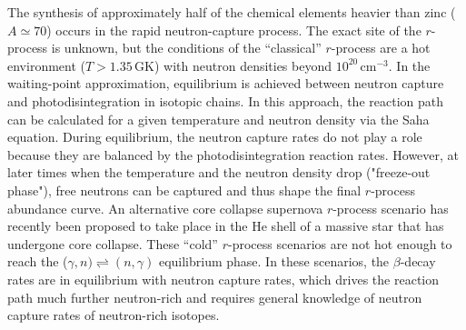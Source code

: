 {The synthesis of approximately half of the chemical elements heavier than zinc ($A \simeq 70$) occurs in the rapid neutron-capture process.
The exact site of the $r$-process is unknown, but the conditions of 
the ``classical'' $r$-process %
are a hot environment ($T> 1.35$\,GK) with neutron densities beyond %
$10^{20}$\,cm$^{-3}$. %
 In the waiting-point approximation, equilibrium is achieved between neutron capture and photodisintegration %
 in isotopic chains. %
In this approach, the reaction path can be  calculated for a given temperature and neutron density via the Saha equation. During equilibrium, the neutron capture rates do not play a role %
because they are balanced by the photodisintegration reaction rates. 
However, at later %
 times when 
the temperature and the neutron density drop ("freeze-out phase"), free neutrons %
can be captured and thus shape the final $r$-process abundance curve.
 An alternative core collapse supernova $r$-process scenario has recently been proposed %
to take place in the He shell of a massive star that has undergone core collapse. 
These %
 ``cold'' $r$-process scenarios
 are not hot enough to %
 reach the ($\gamma,n)\rightleftharpoons(n,\gamma)$ equilibrium phase. In these scenarios, the $\beta$-decay rates are in equilibrium with neutron capture rates, which drives the reaction path much further neutron-rich and requires general knowledge of neutron capture rates of neutron-rich isotopes.

}

